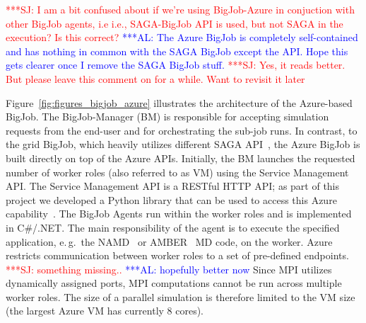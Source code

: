 \documentclass[conference,final]{IEEEtran}
\newcommand{\alnote}[1]{ {\textcolor{blue} { ***AL: #1 }}}
\newcommand{\jhanote}[1]{ {\textcolor{red} { ***SJ: #1 }}}
\newcommand{\alnote}[1]{}
\newcommand{\jhanote}[1]{}
\begin{document}

\jhanote{I am a bit confused about if we're using BigJob-Azure in
  conjuction with other BigJob agents, i.e i.e., SAGA-BigJob API is
  used, but not SAGA in the execution?  Is this correct?}  \alnote{The
  Azure BigJob is completely self-contained and has nothing in common
  with the SAGA BigJob except the API. Hope this gets clearer once I
  remove the SAGA BigJob stuff.}\jhanote{Yes, it reads better. But
  please leave this comment on for a while. Want to revisit it later}

Figure~\ref{fig:figures_bigjob_azure} illustrates the architecture of
the Azure-based BigJob. The BigJob-Manager (BM) is responsible for
accepting simulation requests from the end-user and for orchestrating
the sub-job runs.  In contrast, to the grid BigJob, which heavily
utilizes different SAGA API~\cite{saga_url}, the Azure BigJob is built
directly on top of the Azure APIs. Initially, the BM launches the
requested number of worker roles (also referred to as VM) using the
Service Management API.  The Service Management API is a RESTful HTTP
API; as part of this project we developed a Python library that can be
used to access this Azure capability~\cite{azure-service-python}. The
BigJob Agents run within the worker roles and is implemented in
C\#/.NET. The main responsibility of the agent is to execute the
specified application, e.\,g.\ the NAMD~\cite{Phillips:2005gd} or
AMBER~\cite{tec2} MD code, on the worker. Azure restricts
communication between worker roles to a set of pre-defined endpoints.
\jhanote{something missing..}\alnote{hopefully better now} 
Since MPI utilizes dynamically assigned ports, MPI computations 
cannot be run across multiple worker roles. 
The size of a parallel simulation is therefore
limited to the VM size (the largest Azure VM has currently 8 cores).
\end{document}

